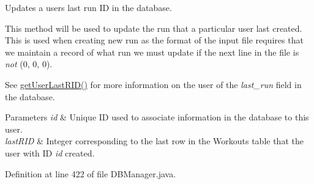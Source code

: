 Updates a user\textquotesingle{}s last run ID in the database.

This method will be used to update the run that a particular user last created. This is used when creating new run as the format of the input file requires that we maintain a record of what run we must update if the next line in the file is {\itshape not} (0, 0, 0).

See \mbox{\hyperlink{classcom_1_1activitytracker_1_1_d_b_manager_aab14c61b3f3a17bdea10cab1b5fd9337}{get\+User\+Last\+R\+I\+D()}} for more information on the user of the {\itshape last\+\_\+run} field in the database.


\begin{DoxyParams}{Parameters}
{\em id} & Unique ID used to associate information in the database to this user. \\
\hline
{\em last\+R\+ID} & Integer corresponding to the last row in the Workouts table that the user with ID {\itshape id} created. \\
\hline
\end{DoxyParams}


Definition at line 422 of file D\+B\+Manager.\+java.


\begin{DoxyCode}{0}

\end{DoxyCode}
\mbox{\label{classcom_1_1activitytracker_1_1_d_b_manager_af05d79f33ecf2920a67d1b9cf82c079f}} 
